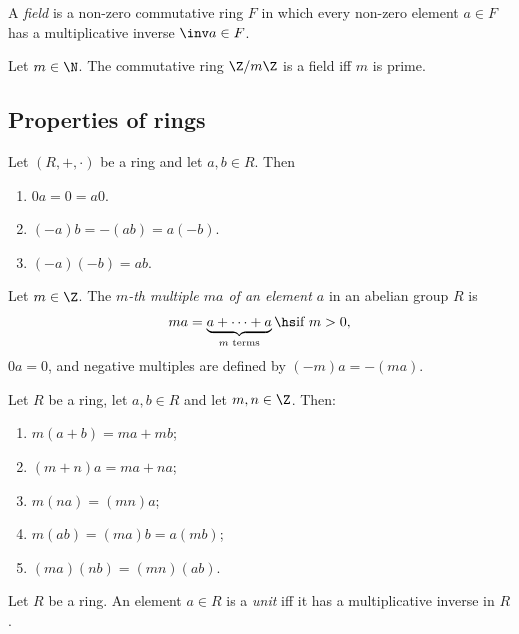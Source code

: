 \documentclass{article}
\begin{document}
\begin{definition}
	A \emph{field} is a non-zero commutative ring $F$ in which every non-zero element
	$a\in F$ has a multiplicative inverse $\inv a\in F$.
\end{definition}

\begin{proposition}[Notes 3.1.11]
	Let $m\in\N$. The commutative ring $\Z/m\Z$ is a field iff $m$ is prime.
\end{proposition}

\subsection{Properties of rings}

\begin{lemma}[Notes 3.2.1]
	Let $(R,+,\cdot)$ be a ring and let $a,b\in R$. Then
	\begin{enumerate}
		\item $0a=0=a0$.
		\item $(-a)b=-(ab)=a(-b)$.
		\item $(-a)(-b) = ab$.
	\end{enumerate}
\end{lemma}

\begin{definition}
	Let $m\in\Z$. The \emph{$m$-th multiple $ma$ of an element $a$} in an abelian
	group $R$ is
	\begin{align*}
		ma = \underbrace{a + \cdots + a}_\text{$m$ terms} \hs \text{if } m >0,
	\end{align*}
	$0a=0$, and negative multiples are defined by $(-m)a=-(ma)$.
\end{definition}

\begin{lemma}[Notes 3.2.4]
	Let $R$ be a ring, let $a,b\in R$ and let $m,n\in\Z$. Then:
	\begin{enumerate}
		\item $m(a+b)=ma+mb$;
		\item $(m+n)a=ma+na$;
		\item $m(na)=(mn)a$;
		\item $m(ab)=(ma)b=a(mb)$;
		\item $(ma)(nb)=(mn)(ab)$.
	\end{enumerate}
\end{lemma}

\begin{definition}
	Let $R$ be a ring. An element $a\in R$ is a \emph{unit} iff it has a
	multiplicative inverse in $R$.
\end{definition}
\end{document}

